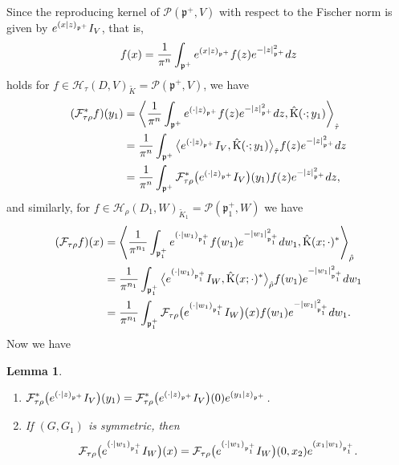 \documentclass[11pt]{article}
\numberwithin{equation}{section}
\newtheorem{Lemma}[Theorem]{Lemma}
\newcommand{\ds}{\displaystyle}
\newcommand{\fp}{\mathfrak{p}}
\newcommand{\cF}{\mathcal{F}}
\newcommand{\cH}{\mathcal{H}}
\newcommand{\cP}{\mathcal{P}}
\newcommand{\rK}{\mathrm{K}}
\begin{document}
Since the reproducing kernel of $\cP(\fp^+,V)$ with respect to the Fischer norm
is given by ${\rm e}^{(x|z)_{\fp^+}}I_V$, that is,
\begin{gather*} f(x)=\frac{1}{\pi^n}\int_{\fp^+}{\rm e}^{(x|z)_{\fp^+}}f(z){\rm e}^{-|z|_{\fp^+}^2}{\rm d}z \end{gather*}
holds for $f\in \cH_\tau(D,V)_{\tilde{K}}=\cP(\fp^+,V)$, we have
\begin{align*}
(\cF_{\tau\rho}^*f)(y_1)&=\left\langle \frac{1}{\pi^n}\int_{\fp^+}{\rm e}^{(\cdot|z)_{\fp^+}}f(z){\rm e}^{-|z|_{\fp^+}^2}{\rm d}z,
\hat{\rK}(\cdot;y_1)\right\rangle_{\hat{\tau}} \\
&=\frac{1}{\pi^n}\int_{\fp^+}\big\langle {\rm e}^{(\cdot|z)_{\fp^+}}I_V,\hat{\rK}(\cdot;y_1)\big\rangle_{\hat{\tau}}f(z){\rm e}^{-|z|_{\fp^+}^2}{\rm d}z \\
&=\frac{1}{\pi^n}\int_{\fp^+}\cF_{\tau\rho}^*\big({\rm e}^{(\cdot|z)_{\fp^+}}I_V\big)(y_1)f(z){\rm e}^{-|z|_{\fp^+}^2}{\rm d}z,
\end{align*}
and similarly, for $f\in \cH_\rho(D_1,W)_{\tilde{K}_1}=\cP(\fp^+_1,W)$ we have
\begin{align*}
(\cF_{\tau\rho}f)(x)&=\left\langle \frac{1}{\pi^{n_1}}\int_{\fp^+_1}{\rm e}^{(\cdot|w_1)_{\fp^+_1}}f(w_1){\rm e}^{-|w_1|_{\fp^+_1}^2}{\rm d}w_1,
\hat{\rK}(x;\cdot)^*\right\rangle_{\hat{\rho}} \\
&=\frac{1}{\pi^{n_1}}\int_{\fp^+_1}\big\langle {\rm e}^{(\cdot|w_1)_{\fp^+_1}}I_W,\hat{\rK}(x;\cdot)^*\big\rangle_{\hat{\rho}}
f(w_1){\rm e}^{-|w_1|_{\fp^+_1}^2}{\rm d}w_1 \\
&=\frac{1}{\pi^{n_1}}\int_{\fp^+_1}\cF_{\tau\rho}\big({\rm e}^{(\cdot|w_1)_{\fp^+_1}}I_W\big)(x)f(w_1){\rm e}^{-|w_1|_{\fp^+_1}^2}{\rm d}w_1.
\end{align*}
Now we have
\begin{Lemma}\quad
\begin{enumerate}\itemsep=0pt
\item[$(1)$] $\ds \cF_{\tau\rho}^*\big({\rm e}^{(\cdot|z)_{\fp^+}}I_V\big)(y_1)=\cF_{\tau\rho}^*\big({\rm e}^{(\cdot|z)_{\fp^+}}I_V\big)(0){\rm e}^{(y_1|z)_{\fp^+}}$.
\item[$(2)$] If $(G,G_1)$ is symmetric, then
\begin{gather*} \cF_{\tau\rho}\big({\rm e}^{(\cdot|w_1)_{\fp^+_1}}I_W\big)(x)=\cF_{\tau\rho}\big({\rm e}^{(\cdot|w_1)_{\fp^+_1}}I_W\big)(0,x_2){\rm e}^{(x_1|w_1)_{\fp^+_1}}. \end{gather*}
\end{enumerate}
\end{Lemma}
\end{document}
